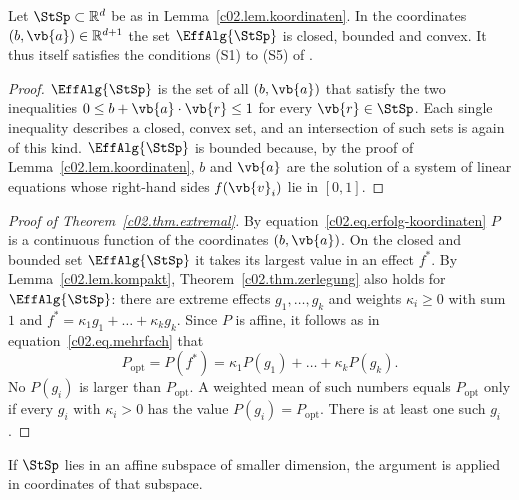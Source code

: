 \begin{vertiefung}[id=c02.v3,
    titel={Why an extreme effect suffices},
    wozu={The core uses Theorem~\ref{c02.thm.extremal} without proof. Here it is proved
      for every state space.},
    voraussetzung={Blocks~\ref{c02.v1} and \ref{c02.v2}; continuous functions on closed,
      bounded sets. The core computes the optimum for the three theories directly in
      Proposition~\ref{c02.prop.optimum} and does not need this block.},
    zurueck={To tell two preparations apart as well as possible it suffices to go through
      the extreme effects.}]
  \begin{lemma}\label{c02.lem.kompakt}
    Let $\StSp \subset \mathbb{R}^d$ be as in Lemma~\ref{c02.lem.koordinaten}. In the
    coordinates $(b, \vb{a}) \in \mathbb{R}^{d+1}$ the set $\EffAlg{\StSp}$ is closed,
    bounded and convex. It thus itself satisfies the conditions (S1) to (S5) of
    .
  \end{lemma}
  \begin{proof}
    $\EffAlg{\StSp}$ is the set of all $(b, \vb{a})$ that satisfy the two inequalities
    $0 \leq b + \vb{a}\cdot\vb{r} \leq 1$ for every $\vb{r} \in \StSp$. Each single
    inequality describes a closed, convex set, and an intersection of such sets is again
    of this kind. $\EffAlg{\StSp}$ is bounded because, by the proof of
    Lemma~\ref{c02.lem.koordinaten}, $b$ and $\vb{a}$ are the solution of a system of
    linear equations whose right-hand sides $f(\vb{v}_i)$ lie in $[0,1]$.
  \end{proof}

  \begin{proof}[Proof of Theorem~\ref{c02.thm.extremal}]
    By equation~\eqref{c02.eq.erfolg-koordinaten} $P$ is a continuous function of the
    coordinates $(b, \vb{a})$. On the closed and bounded set $\EffAlg{\StSp}$ it takes its
    largest value in an effect $f^{*}$. By Lemma~\ref{c02.lem.kompakt},
    Theorem~\ref{c02.thm.zerlegung} also holds for $\EffAlg{\StSp}$: there are extreme
    effects $g_1, \dots, g_k$ and weights $\kappa_i \geq 0$ with sum $1$ and
    $f^{*} = \kappa_1 g_1 + \dots + \kappa_k g_k$. Since $P$ is affine, it follows as in
    equation~\eqref{c02.eq.mehrfach} that
    \begin{equation*}
      P_{\mathrm{opt}} = P(f^{*}) = \kappa_1 P(g_1) + \dots + \kappa_k P(g_k) .
    \end{equation*}
    No $P(g_i)$ is larger than $P_{\mathrm{opt}}$. A weighted mean of such numbers equals
    $P_{\mathrm{opt}}$ only if every $g_i$ with $\kappa_i > 0$ has the value
    $P(g_i) = P_{\mathrm{opt}}$. There is at least one such $g_i$.
  \end{proof}

  If $\StSp$ lies in an affine subspace of smaller dimension, the argument is applied in
  coordinates of that subspace.
\end{vertiefung}

